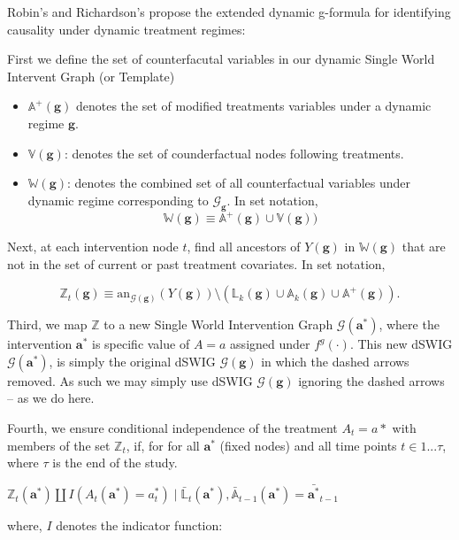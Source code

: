 \documentclass[
  single column]{article}
\providecommand{\tightlist}{%
  \setlength{\itemsep}{0pt}\setlength{\parskip}{0pt}}\usepackage{longtable,booktabs,array}
\begin{document}
Robin's and Richardson's propose the extended dynamic g-formula for
identifying causality under dynamic treatment regimes:

First we define the set of counterfacutal variables in our dynamic
Single World Intervent Graph (or Template)

\begin{itemize}
\tightlist
\item
  \(\mathbb{A}^+(\mathbf{g})\) denotes the set of modified treatments
  variables under a dynamic regime \(\mathbf{g}\).
\item
  \(\mathbb{V}(\mathbf{g})\): denotes the set of counderfactual nodes
  following treatments.
\item
  \(\mathbb{W}(\mathbf{g})\): denotes the combined set of all
  counterfactual variables under dynamic regime corresponding to
  \(\mathcal{G}_\mathbf{g}\). In set notation, \[
  \mathbb{W}(\mathbf{g}) \equiv \mathbb{A}^+(\mathbf{g}) \cup \mathbb{V}(\mathbf{g}))
  \]
\end{itemize}

Next, at each intervention node \(t\), find all ancestors of
\(Y(\mathbf{g})\) in \(\mathbb{W}(\mathbf{g})\) that are not in the set
of current or past treatment covariates. In set notation,

\[
\mathbb{Z}_t(\mathbf{g}) \equiv \text{an}_{\mathcal{G}(\mathbf{g})}(Y(\mathbf{g})) \setminus (\mathbb{L}_k(\mathbf{g}) \cup \mathbb{A}_k(\mathbf{g}) \cup \mathbb{A}^+(\mathbf{g})).
\]

Third, we map \(\mathbb{Z}\) to a new Single World Intervention Graph
\(\mathcal{G}(\mathbf{a}^*)\), where the intervention \(\mathbf{a}^*\)
is specific value of \(A = a\) assigned under \(f^g(\cdot)\). This new
dSWIG \(\mathcal{G}(\mathbf{a}^*)\), is simply the original dSWIG
\(\mathcal{G}(\mathbf{g})\) in which the dashed arrows removed. As such
we may simply use dSWIG \(\mathcal{G}(\mathbf{g})\) ignoring the dashed
arrows -- as we do here.

Fourth, we ensure conditional independence of the treatment \(A_t = a*\)
with members of the set \(\mathbb{Z}_t\), if, for for all
\(\mathbf{a^*}\) (fixed nodes) and all time points \(t \in 1...\tau\),
where \(\tau\) is the end of the study.

\(\mathbb{Z}_t(\mathbf{a}^*) \coprod I(A_t(\mathbf{a}^*) = a^*_t) \mid \bar{\mathbb{L}}_t(\mathbf{a}^*), \bar{\mathbb{A}}_{t-1}(\mathbf{a}^*) = \bar{\mathbf{a}^*}_{t-1}\)

where, \(I\) denotes the indicator function:
\end{document}
